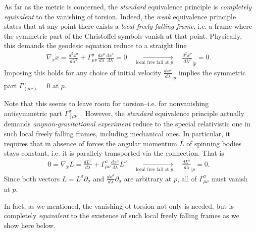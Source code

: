 \documentclass[../geometry_main.tex]{subfiles}
\begin{document}
\begin{mytheorem}
As far as the metric is concerned, the \emph{standard} equivalence principle is \emph{completely equivalent} to the vanishing of torsion.
Indeed, the \emph{weak} equivalence principle states that at any point there exists a \emph{local freely falling frame}, i.e. a frame where the symmetric part of the Christoffel symbols vanish at that point.
Physically, this demands the geodesic equation reduce to a straight line
\begin{align}
    \nabla_{\dot{x}}\dot{x} = \frac{d^2 x^{\sigma}}{d \lambda^2} + \Gamma^{\sigma}_{\mu \nu} \frac{d x^{\mu}}{d \lambda} \frac{d x^{\nu}}{d \lambda} = 0
    \quad \xrightarrow[\text{local free fall at $p$}]{} \quad
    \frac{d^2 x^{\sigma}}{d \lambda^2}_{\mid p} = 0.
\end{align} 
Imposing this holds for any choice of initial velocity \(\frac{d x^{\mu}}{d \lambda}_{\mid p}\) implies the symmetric part $\Gamma_{(\mu\nu)}^\sigma=0$ at \(p\).

Note that this seems to leave room for torsion--i.e. for nonvanishing antisymmetric part $\Gamma_{[\mu\nu]}^\sigma$.
However, the \emph{standard} equivalence principle actually demands \emph{anynon-gravitational experiment} reduce to the special relativistic one in such local freely falling frames, including mechanical ones.
In particular, it requires that in absence of forces the angular momentum $L$ of spinning bodies stays constant, i.e. it is parallely transported via the connection.
That is 
\begin{align}
    0=\nabla_{\dot{x}}L = \frac{d L^\sigma}{d \lambda} + \Gamma^{\sigma}_{\mu \nu} \frac{d x^\mu}{d \lambda} L^\nu 
    \quad \xrightarrow[\text{local free fall at $p$}]{} \quad
    \frac{d L^\sigma}{d \lambda}_{\mid p} = 0.
\end{align}
Since both vectors $L=L^\sigma \partial_\sigma$ and $\tfrac{dx^\sigma}{d \lambda}\partial_\sigma$ are arbitrary at \(p\), all of $\Gamma_{\mu\nu}^\sigma$ must vanish at \(p\).

In fact, as we mentioned, the vanishing ot torsion not only is needed, but is completely \emph{equivalent} to the existence of such local freely falling frames as we show here below.
\end{mytheorem}
\end{document}
